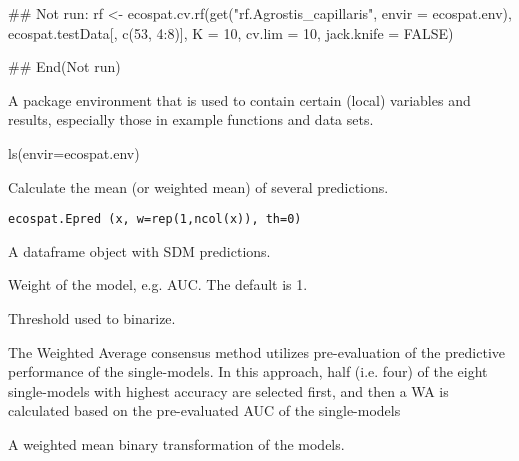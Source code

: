 \documentclass[a4paper]{book}
\begin{document}
%
\begin{Examples}
\begin{ExampleCode}
## Not run: 
rf <- ecospat.cv.rf(get("rf.Agrostis_capillaris", envir = ecospat.env), 
ecospat.testData[, c(53, 4:8)], K = 10, cv.lim = 10, jack.knife = FALSE)

## End(Not run)
\end{ExampleCode}
\end{Examples}
%
\begin{Description}\relax
A package environment that is used to contain certain (local) variables and results, especially those in example functions and data sets.
\end{Description}
%
\begin{Examples}
\begin{ExampleCode}
ls(envir=ecospat.env)
\end{ExampleCode}
\end{Examples}
%
\begin{Description}\relax
Calculate the mean (or weighted mean) of several predictions.
\end{Description}
%
\begin{Usage}
\begin{verbatim}
ecospat.Epred (x, w=rep(1,ncol(x)), th=0)
\end{verbatim}
\end{Usage}
%
\begin{Arguments}
\begin{ldescription}
\item[\code{x}] A dataframe object with SDM predictions.
\item[\code{w}] Weight of the model, e.g. AUC. The default is 1.
\item[\code{th}] Threshold used to binarize.
\end{ldescription}
\end{Arguments}
%
\begin{Details}\relax
The Weighted Average consensus method utilizes pre-evaluation of the predictive performance of the single-models. In this approach, half (i.e. four) of the eight single-models with highest accuracy are selected first, and then a WA is calculated based on the pre-evaluated AUC of the single-models
\end{Details}
%
\begin{Value}
A weighted mean binary transformation of the models.
\end{Value}
\end{document}
